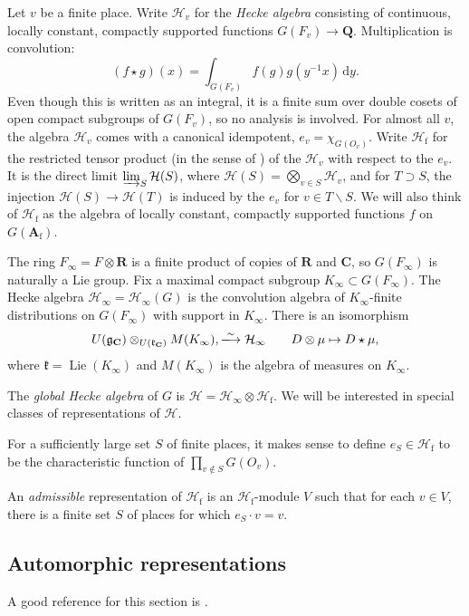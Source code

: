 \documentclass[oneside]{amsart}
\DeclareMathOperator{\lie}{Lie}
\newcommand{\dA}{\mathbf{A}}
\newcommand{\dC}{\mathbf{C}}
\newcommand{\dR}{\mathbf{R}}
\newcommand{\dQ}{\mathbf{Q}}
\newcommand{\fg}{\mathfrak{g}}
\newcommand{\fk}{\mathfrak{k}}
\newcommand{\dd}{\mathrm{d}}
\newcommand{\finite}{\mathrm{f}}
\newcommand{\hecke}{\mathcal{H}}
\newcommand{\iso}{\xlongrightarrow\sim}
\begin{document}
Let $v$ be a finite place. Write $\hecke_v$ for the \emph{Hecke 
algebra} consisting of continuous, locally constant, compactly supported 
functions $G(F_v) \to \dQ$. Multiplication is convolution: 
\[
  (f\star g)(x) = \int_{G(F_v)} f(g) g(y^{-1} x)\, \dd y .
\]
Even though this is written as an integral, it is a finite sum over double 
cosets of open compact subgroups of $G(F_v)$, so no analysis is involved. For 
almost all $v$, the algebra $\hecke_v$ comes with a canonical idempotent, 
$e_v=\chi_{G(O_v)}$. Write $\hecke_\finite$ for the restricted tensor product 
(in the sense of \cite[\S 2]{f79}) of the $\hecke_v$ with respect to the 
$e_v$. It is the direct limit $\varinjlim_S \hecke(S)$, where 
$\hecke(S)=\bigotimes_{v\in S} \hecke_v$, and for 
$T\supset S$, the injection $\hecke(S)\to \hecke(T)$ is induced by the 
$e_v$ for $v\in T\smallsetminus S$. We will also think of $\hecke_\finite$ as 
the algebra of locally constant, compactly supported functions $f$ on 
$G(\dA_\finite)$. 

The ring $F_\infty=F\otimes\dR$ is a finite product of copies of $\dR$ and 
$\dC$, so  $G(F_\infty)$ is naturally a Lie group. Fix a maximal compact 
subgroup $K_\infty\subset G(F_\infty)$. The Hecke algebra 
$\hecke_\infty=\hecke_\infty(G)$ is the convolution algebra of $K_\infty$-finite 
distributions on $G(F_\infty)$ with support in $K_\infty$. There is an 
isomorphism 
\[
  U(\fg_\dC)\otimes_{U(\fk_\dC)} M(K_\infty), \iso \hecke_\infty \qquad D\otimes \mu\mapsto D\star \mu ,
\]
where $\fk=\lie(K_\infty)$ and $M(K_\infty)$ is the algebra of measures on 
$K_\infty$. 

The \emph{global Hecke algebra} of $G$ is 
$\hecke=\hecke_\infty\otimes\hecke_\finite$. We will be interested in 
special classes of representations of $\hecke$. 

For a sufficiently large set $S$ of finite places, it makes sense to define 
$e_S\in \hecke_\finite$ to be the characteristic function of 
$\prod_{v\notin S} G(O_v)$. 

An \emph{admissible} representation of $\hecke_\finite$ is an 
$\hecke_\finite$-module $V$ such that for each $v\in V$, there is a finite set 
$S$ of places for which $e_S\cdot v = v$. 


\subsection{Automorphic representations}

A good reference for this section is \cite{bj79}. 
\end{document}
